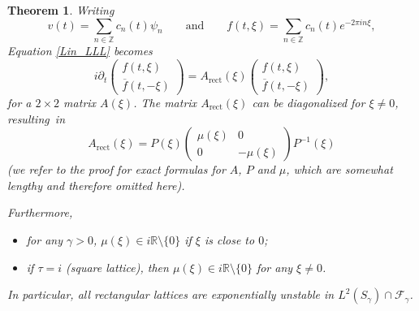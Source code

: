 \documentclass[10pt]{amsart}
\newtheorem{theorem}{Theorem}[section]
\theoremstyle{definition}
\newcommand\Z{\mathbb Z}
\begin{document}
\begin{theorem}
\label{thmunstable}
Writing
\[
v(t) = \sum_{n \in \Z} c_n(t) \psi_n \qquad \text{and} \qquad
f(t,\xi) = \sum_{n \in \Z} c_n(t) e^{-2\pi i n\xi},
\]
Equation \eqref{Lin_LLL} becomes
\[
i \partial_t \begin{pmatrix} {f}(t,\xi) \\[2pt] \overline{{f}}(t,-\xi) \end{pmatrix} = A_{\mathrm{rect}}(\xi) \begin{pmatrix} {f}(t,\xi) \\[2pt] \overline{{f}}(t,-\xi) \end{pmatrix},
\]
for a $2\times 2$ matrix $A(\xi)$. The matrix $A_{\mathrm{rect}}(\xi) $ can be diagonalized for $\xi \neq 0$, resulting~in
\[
A_{\mathrm{rect}}(\xi) = P(\xi) \begin{pmatrix} \mu(\xi) & 0 \\[2pt] 0 & -\mu(\xi) \end{pmatrix} P^{-1}(\xi)
\]
(we refer to the proof for exact formulas for $A$, $P$ and $\mu$, which are somewhat lengthy and therefore omitted here).

Furthermore,
\begin{itemize}
\item for any $\gamma>0$, $\mu(\xi) \in i \mathbb{R} \setminus\{ 0 \}$ if $\xi$ is close to $0$;
\item if $\tau = i$ (square lattice), then $\mu(\xi) \in i \mathbb{R} \setminus\{ 0 \}$ for any $\xi \neq 0$.
\end{itemize}

In particular, all rectangular lattices are exponentially unstable in $L^2(S_\gamma) \cap \mathcal{F}_\gamma$.
\end{theorem}
\end{document}
